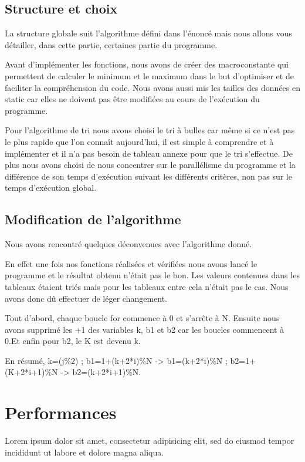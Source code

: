 \documentclass[12pt]{article}
\begin{document}
\subsection{Structure et choix}

    La structure globale suit l'algorithme défini dans l'énoncé mais nous allons vous détailler, dans cette partie, certaines partie du programme.
    
    Avant d'implémenter les fonctions, nous avons de créer des macroconstante qui permettent de calculer le minimum et le maximum dans le but d'optimiser et de faciliter la compréhension du code. Nous avons aussi mis les tailles des données en static car elles ne doivent pas être modifiées au cours de l'exécution du programme.
    
    Pour l'algorithme de tri nous avons choisi le tri à bulles car même si ce n'est pas le plus rapide que l'on connaît aujourd'hui, il est simple à comprendre et à implémenter et il n'a pas besoin de tableau annexe pour que le tri s'effectue. De plus nous avons choisi de nous concentrer sur le parallélisme du programme et la différence de son temps d'exécution suivant les différents critères, non pas sur le temps d'exécution global.


\subsection{Modification de l'algorithme}

    Nous avons rencontré quelques déconvenues avec l'algorithme donné. 
    
    En effet une fois nos fonctions réalisées et vérifiées nous avons lancé le programme et le résultat obtenu n'était pas le bon. Les valeurs contenues dans les tableaux étaient triés mais pour les tableaux entre cela n'était pas le cas. Nous avons donc dû effectuer de léger changement.
    
    Tout d'abord, chaque boucle for commence à 0 et s'arrête à N.
    Ensuite nous avons supprimé les +1 des variables k, b1 et b2 car les boucles commencent à 0.Et enfin pour b2, le K est devenu k. 

    En résumé, k=(j\%2) ; b1=1+(k+2*i)\%N -> b1=(k+2*i)\%N ; b2=1+(K+2*i+1)\%N -> b2=(k+2*i+1)\%N.

\section{Performances}

Lorem ipsum dolor sit amet, consectetur adipisicing elit, sed do eiusmod tempor
incididunt ut labore et dolore magna aliqua.
\end{document}
